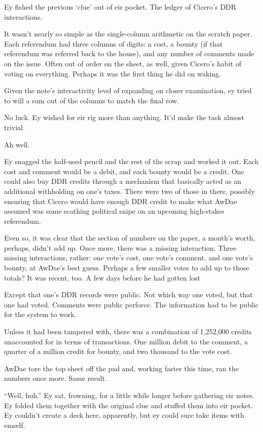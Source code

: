 Ey fished the previous `clue' out of eir pocket. The ledger of Cicero's DDR interactions.

It wasn't nearly so simple as the single-column arithmetic on the scratch paper. Each referendum had three columns of digits: a cost, a bounty (if that referendum was referred back to the house), and any number of comments made on the issue. Often out of order on the sheet, as well, given Cicero's habit of voting on everything. Perhaps it was the first thing he did on waking.

Given the note's interactivity level of expanding on closer examination, ey tried to will a sum out of the columns to match the final row.

No luck. Ey wished for eir rig more than anything. It'd make the task almost trivial.

Ah well.

Ey snagged the half-used pencil and the rest of the scrap and worked it out. Each cost and comment would be a debit, and each bounty would be a credit. One could also buy DDR credits through a mechanism that basically acted as an additional withholding on one's taxes. There were two of those in there, possibly ensuring that Cicero would have enough DDR credit to make what AwDae assumed was some scathing political snipe on an upcoming high-stakes referendum.

Even so, it was clear that the section of numbers on the paper, a month's worth, perhaps, didn't add up. Once more, there was a missing interaction. Three missing interactions, rather: one vote's cost, one vote's comment, and one vote's bounty, at AwDae's best guess. Perhaps a few smaller votes to add up to those totals? It was recent, too. A few days before he had gotten lost

Except that one's DDR records were public. Not which way one voted, but that one had voted. Comments were public perforce. The information had to be public for the system to work.

Unless it had been tampered with, there was a combination of 1,252,000 credits unaccounted for in terms of transactions. One million debit to the comment, a quarter of a million credit for bounty, and two thousand to the vote cost.

AwDae tore the top sheet off the pad and, working faster this time, ran the numbers once more. Same result.

``Well, huh.'' Ey sat, frowning, for a little while longer before gathering eir notes. Ey folded them together with the original clue and stuffed them into eir pocket. Ey couldn't create a deck here, apparently, but ey could sure take items with emself.

